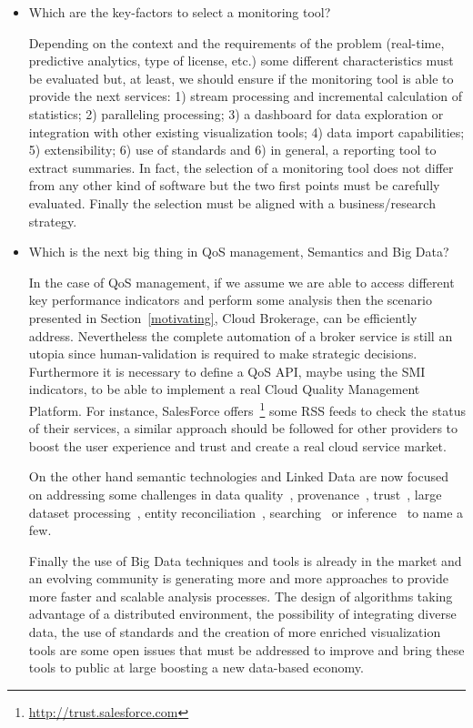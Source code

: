 \begin{itemize}
\item Which are the key-factors to select a monitoring tool?


Depending on the context and the requirements of the problem (real-time, predictive analytics, type of license, etc.) 
some different characteristics must be evaluated but, at least, we should ensure if the monitoring tool 
is able to provide the next services: 1) stream processing and incremental calculation of statistics; 
2) paralleling processing; 3) a dashboard for data exploration or integration with other 
existing visualization tools; 4) data import capabilities; 5) extensibility; 6) use of standards and 6) in general, 
a reporting tool to extract summaries. In fact, the selection of a monitoring tool does not differ from 
any other kind of software but the two first points must be carefully evaluated. Finally the selection 
must be aligned with a business/research strategy.


\item Which is the next big thing in QoS management, Semantics and Big Data?

In the case of QoS management, if we assume we are able to access different key performance indicators and perform 
some analysis then the scenario presented in Section~\ref{motivating}, Cloud Brokerage, can 
be efficiently address. Nevertheless the complete automation of a broker service is still 
an utopia since human-validation is required to make strategic decisions. Furthermore it is necessary 
to define a QoS API, maybe using the SMI indicators, to be able to implement a real Cloud Quality Management 
Platform. For instance, SalesForce offers~\footnote{\url{http://trust.salesforce.com}} 
some RSS feeds to check the status of their services, a similar approach should be followed for other providers to boost 
the user experience and trust and create a real cloud service market.

On the other hand semantic technologies and Linked Data are now focused on addressing some challenges in
data quality~\cite{bizer2007,Bizer2009QA,lodq,link-qa}, provenance~\cite{DBLP:conf/ipaw/HartigZ10}, trust~\cite{Carroll05namedgraphs}, 
large dataset processing~\cite{DBLP:conf/closer/HausenblasGHC12}, entity reconciliation~\cite{Maali_Cyganiak_2011}, 
searching~\cite{hoga-etal-2011-swse-JWS} or inference~\cite{DBLP:journals/ws/BonattiHPS11} to name a few.

Finally the use of Big Data techniques and tools is already in the market and an evolving community is generating 
more and more approaches to provide more faster and scalable analysis processes. The design of algorithms taking 
advantage of a distributed environment, the possibility of integrating diverse data, the use of standards and the creation 
of more enriched visualization tools are some open issues that must be addressed to improve and bring these tools 
to public at large boosting a new data-based economy.

\end{itemize}

